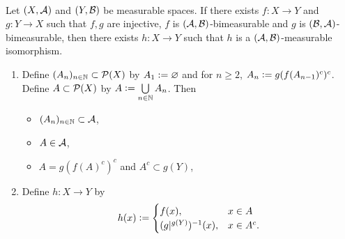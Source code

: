 \documentclass{book}
\begin{document}
	\begin{ex}   \\
		Let $(X, \mathcal{A})$ and $(Y, \mathcal{B})$ be measurable spaces. If there exists $f:X \rightarrow Y$ and $g: Y \rightarrow X$ such that $f,g$ are injective, $f$ is $(\mathcal{A}, \mathcal{B})$-bimeasurable and $g$ is $(\mathcal{B}, \mathcal{A})$-bimeasurable, then there exists $h: X \rightarrow Y$ such that $h$ is a $(\mathcal{A}, \mathcal{B})$-measurable isomorphism. \\
		\begin{enumerate}
			\item Define $(A_n)_{n \in \mathbb{N}} \subset \mathcal{P}(X)$ by $A_1 \vcentcolon= \varnothing$ and for $n \geq 2$, $A_n \vcentcolon= g(f(A_{n-1})^c)^c$. Define $A \subset \mathcal{P}(X)$ by $A \vcentcolon= \bigcup\limits_{n \in \mathbb{N}} A_n$.
			Then 
			\begin{itemize}
				\item $(A_n)_{n \in \mathbb{N}} \subset \mathcal{A}$,
				\item $A \in \mathcal{A}$,
				\item $A = g(f(A)^c)^c$ and $A^c \subset g(Y)$, 
			\end{itemize}
			\item Define $h:X \rightarrow Y$ by 
			\[
			h(x) \vcentcolon= 
			\begin{cases}
				f(x), & x \in A \\
				(g|^{g(Y)})^{-1}(x),  & x \in A^c.
			\end{cases}
			\]
		\end{enumerate}
	\end{ex}
	
\end{document}
